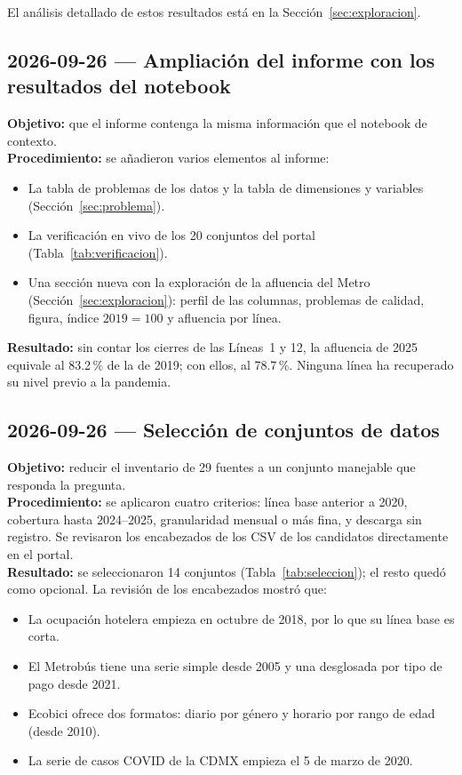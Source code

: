 El análisis detallado de estos resultados está en la Sección~\ref{sec:exploracion}.


\subsection{2026-09-26 --- Ampliación del informe con los resultados del notebook}
\textbf{Objetivo:} que el informe contenga la misma información que el notebook de contexto.\\
\textbf{Procedimiento:} se añadieron varios elementos al informe:
\begin{itemize}
  \item La tabla de problemas de los datos y la tabla de dimensiones y variables (Sección~\ref{sec:problema}).
  \item La verificación en vivo de los 20 conjuntos del portal (Tabla~\ref{tab:verificacion}).
  \item Una sección nueva con la exploración de la afluencia del Metro (Sección~\ref{sec:exploracion}):
        perfil de las columnas, problemas de calidad, figura, índice $2019 = 100$ y afluencia por línea.
\end{itemize}
\textbf{Resultado:} sin contar los cierres de las Líneas~1 y 12, la afluencia de 2025 equivale al
83.2\,\% de la de 2019; con ellos, al 78.7\,\%. Ninguna línea ha recuperado su nivel previo a la
pandemia.

\subsection{2026-09-26 --- Selección de conjuntos de datos}
\textbf{Objetivo:} reducir el inventario de 29 fuentes a un conjunto manejable que responda la pregunta.\\
\textbf{Procedimiento:} se aplicaron cuatro criterios: línea base anterior a 2020, cobertura hasta
2024--2025, granularidad mensual o más fina, y descarga sin registro. Se revisaron los encabezados
de los CSV de los candidatos directamente en el portal.\\
\textbf{Resultado:} se seleccionaron 14 conjuntos (Tabla~\ref{tab:seleccion}); el resto quedó como opcional.
La revisión de los encabezados mostró que:
\begin{itemize}
  \item La ocupación hotelera empieza en octubre de 2018, por lo que su línea base es corta.
  \item El Metrobús tiene una serie simple desde 2005 y una desglosada por tipo de pago desde 2021.
  \item Ecobici ofrece dos formatos: diario por género y horario por rango de edad (desde 2010).
  \item La serie de casos COVID de la CDMX empieza el 5 de marzo de 2020.
\end{itemize}

